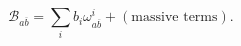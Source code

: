 \begin{equation}
\mathcal{B}_{a \overline{b}} = \sum_{i} b_{i} \omega^{i}_{a \overline{b}}
         + (\textrm{massive terms}).
\end{equation}

